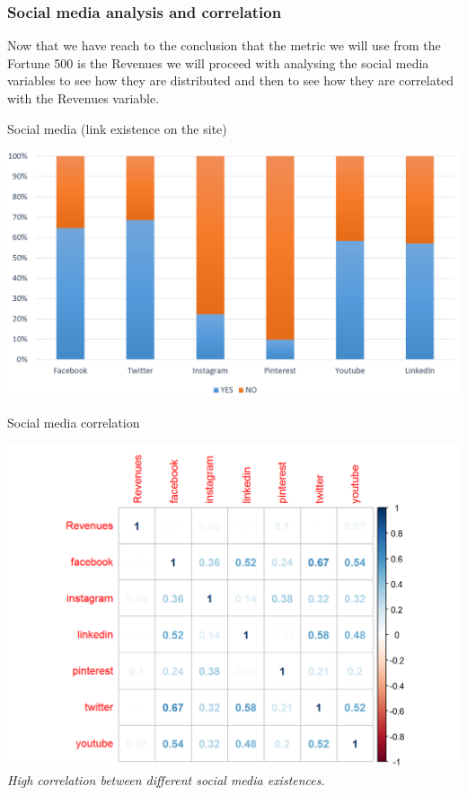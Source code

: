 \documentclass{book}
\begin{document}
\subsubsection{Social media analysis and correlation}
Now that we have reach to the conclusion that the metric we will use from the Fortune 500 is the Revenues we will proceed with analysing the social media variables to see how they are distributed and then to see how they are correlated with the Revenues variable.\\
\begin{table}[H]
\centering
\caption{Social media (link existence on the site)}
\begin{center}
\includegraphics[scale=0.6]{../R/photos/10_socialmedia.png}
\end{center}
\end{table}
\begin{table}[H]
\centering
\caption{Social media correlation}
\begin{center}
\includegraphics[scale=0.5]{../R/photos/22_REV_SM.png}  \\
\textit{High correlation between different social media existences.}
\end{center}
\end{table}
\end{document}
